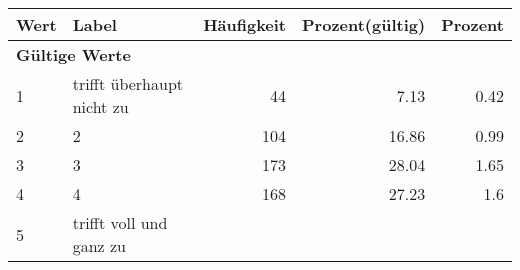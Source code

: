      \begin{longtable}{lXrrr}
     \toprule
     \textbf{Wert} & \textbf{Label} & \textbf{Häufigkeit} & \textbf{Prozent(gültig)} & \textbf{Prozent} \\
     \endhead
     \midrule
     \multicolumn{5}{l}{\textbf{Gültige Werte}}\\

     1 &
     \multicolumn{1}{X}{ trifft überhaupt nicht zu   } &


       \num{44} &
       \num[round-mode=places,round-precision=2]{7,13} &
         \num[round-mode=places,round-precision=2]{0,42} \\

     2 &
     \multicolumn{1}{X}{ 2   } &


       \num{104} &
       \num[round-mode=places,round-precision=2]{16,86} &
         \num[round-mode=places,round-precision=2]{0,99} \\

     3 &
     \multicolumn{1}{X}{ 3   } &


       \num{173} &
       \num[round-mode=places,round-precision=2]{28,04} &
         \num[round-mode=places,round-precision=2]{1,65} \\

     4 &
     \multicolumn{1}{X}{ 4   } &


       \num{168} &
       \num[round-mode=places,round-precision=2]{27,23} &
         \num[round-mode=places,round-precision=2]{1,6} \\

     5 &
     \multicolumn{1}{X}{ trifft voll und ganz zu   } &



\end{longtable}
